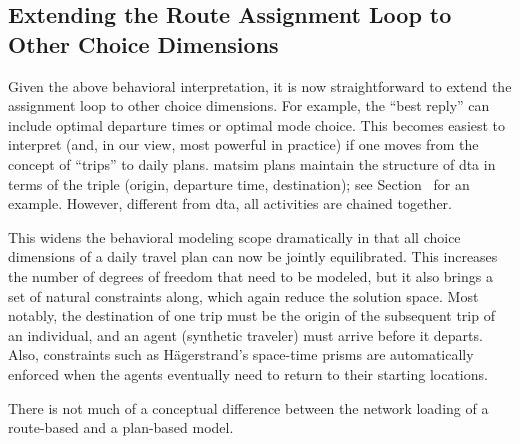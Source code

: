 \subsection{Extending the Route Assignment Loop to Other Choice Dimensions}
\label{sec:extend-route-assignm}

Given the above behavioral interpretation, it is now straightforward
to extend the assignment loop to other choice dimensions.  For
example, the ``best reply'' can include optimal departure times
\citep[e.g.][]{METROPOLIS,EttemaEtcRoutes-timesIatbr03} or optimal mode
choice.  This becomes easiest to interpret (and, in our view, most
powerful in practice) if one moves from the concept of ``trips'' to
daily plans.
\gls{matsim} plans maintain the structure of \gls{dta} in terms of the triple
(origin, departure time, destination); see Section~ for an
example. However, different from \gls{dta}, all activities are chained together.

This widens the behavioral modeling scope dramatically in that all
choice dimensions of a daily travel plan can now be jointly
equilibrated. This increases the number of degrees of freedom that
need to be modeled, but it also brings a set of natural constraints
along, which again reduce the solution space. Most notably, the
destination of one trip must be the origin of the subsequent trip of
an individual, and an agent (synthetic traveler) must arrive before it departs.
Also, constraints such as H\"agerstrand's space-time prisms
\citep{Haegerstrand1970WhatAboutPeople} are
automatically enforced when the agents eventually need
to return to their starting locations.

There is not much of a conceptual difference between the network loading of
a route-based and a plan-based model.

